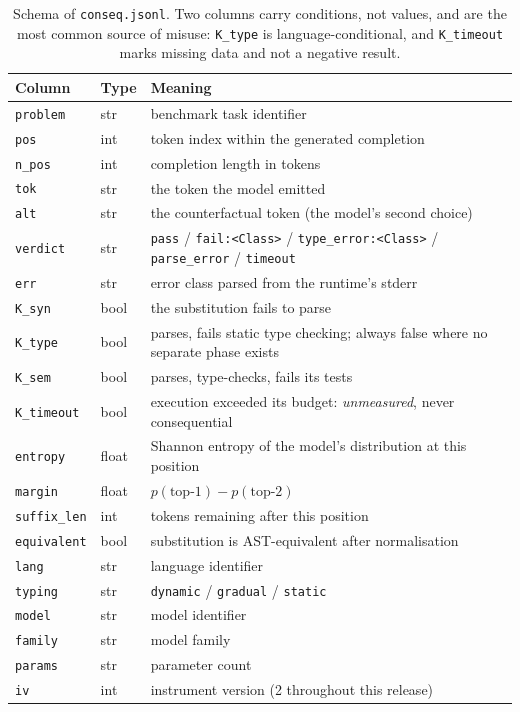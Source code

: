 \begin{table}[H]
\centering\small
\begin{tabular}{llp{8.2cm}}
\toprule
Column & Type & Meaning \\
\midrule
\texttt{problem} & str & benchmark task identifier \\
\texttt{pos} & int & token index within the generated completion \\
\texttt{n\_pos} & int & completion length in tokens \\
\texttt{tok} & str & the token the model emitted \\
\texttt{alt} & str & the counterfactual token (the model's second choice) \\
\texttt{verdict} & str & \texttt{pass} / \texttt{fail:<Class>} / \texttt{type\_error:<Class>} / \texttt{parse\_error} / \texttt{timeout} \\
\texttt{err} & str & error class parsed from the runtime's stderr \\
\texttt{K\_syn} & bool & the substitution fails to parse \\
\texttt{K\_type} & bool & parses, fails static type checking; always false where no separate phase exists \\
\texttt{K\_sem} & bool & parses, type-checks, fails its tests \\
\texttt{K\_timeout} & bool & execution exceeded its budget: \emph{unmeasured}, never consequential \\
\texttt{entropy} & float & Shannon entropy of the model's distribution at this position \\
\texttt{margin} & float & $p(\text{top-1}) - p(\text{top-2})$ \\
\texttt{suffix\_len} & int & tokens remaining after this position \\
\texttt{equivalent} & bool & substitution is AST-equivalent after normalisation \\
\texttt{lang} & str & language identifier \\
\texttt{typing} & str & \texttt{dynamic} / \texttt{gradual} / \texttt{static} \\
\texttt{model} & str & model identifier \\
\texttt{family} & str & model family \\
\texttt{params} & str & parameter count \\
\texttt{iv} & int & instrument version (2 throughout this release) \\
\bottomrule
\end{tabular}
\caption{Schema of \texttt{conseq.jsonl}. Two columns carry conditions, not values, and are the
most common source of misuse: \texttt{K\_type} is language-conditional, and \texttt{K\_timeout}
marks missing data and not a negative result.}
\label{tab:schema}
\end{table}

